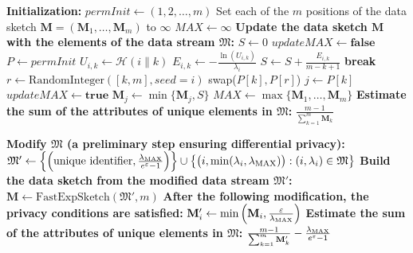 \begin{algorithm}[htbp]
\caption{FastExpSketch($\mathfrak{M}, m$)}
\label{alg:expsketch}
\begin{algorithmic}[1]
\State \textbf{Initialization:}
\State $\mathit{permInit} \gets (1, 2, \ldots, m)$
\State Set each of the $m$ positions of the data sketch $\mathbf{M} = (\mathbf{M}_1, \ldots, \mathbf{M}_m)$ to $\infty$
\State $\mathit{MAX} \gets \infty$
\State
\State \textbf{Update the data sketch $\mathbf{M}$ with the elements of the data stream $\mathfrak{M}$:}
    \State $S \gets 0$
    \State $\mathit{updateMAX} \gets \mathbf{false}$
    \State $P \gets \mathit{permInit}$
        \State $U_{i,k} \gets \mathcal{H}(i \mathbin{\|} k)$ \Comment{hash $\mathcal{H}(x) \in [0, 1)$}
        \State $E_{i,k} \gets -\frac{\ln(U_{i,k})}{\lambda_i}$
        \State $S \gets S + \frac{E_{i,k}}{m - k + 1}$
            \State \textbf{break}
        \EndIf
        \State $r \gets \mathrm{RandomInteger}([k, m], \mathit{seed} = i)$
        \State swap($P[k], P[r]$)
        \State $j \gets P[k]$
            \State $\mathit{updateMAX} \gets \mathbf{true}$
        \EndIf
        \State $\mathbf{M}_j \gets \min \{\mathbf{M}_j, S\}$
    \EndFor
        \State $\mathit{MAX} \gets \max\{\mathbf{M}_1, \ldots, \mathbf{M}_m\}$
    \EndIf
\EndFor
\State
\State \textbf{Estimate the sum of the attributes of unique elements in $\mathfrak{M}$:}
\State \Return $\frac{m-1}{\sum_{k=1}^{m} \mathbf{M}_k}$
\end{algorithmic}
\end{algorithm}

\begin{algorithm}[htbp]
\caption{DP-FastExpSketch($\mathfrak{M}, m, \lmax, \varepsilon$)}
\label{alg:df_expsketch2}
\begin{algorithmic}[1]
\State \textbf{Modify $\mathfrak{M}$ (a preliminary step ensuring differential privacy):}
\State $\mathfrak{M}' \gets \left\{ \left(\text{unique identifier}, \frac{\lambda_{\mathrm{MAX}}}{e^\varepsilon - 1}\right) \right\} \cup \left\{ \bigl(i, \min(\lambda_i, \lambda_{\mathrm{MAX}})\bigr) : (i,\lambda_i) \in \mathfrak{M} \right\}$
\State
\State \textbf{Build the data sketch from the modified data stream $\mathfrak{M}'$:}
\State $\mathbf{M} \gets \mathrm{FastExpSketch}(\mathfrak{M}', m)$
\State
\State \textbf{After the following modification, the privacy conditions are satisfied:}
    \State $\mathbf{M}'_{i} \gets \min\left(\mathbf{M}_{i}, \frac{\varepsilon}{\lambda_{\mathrm{MAX}}}\right)$
\EndFor
\State
\State \textbf{Estimate the sum of the attributes of unique elements in $\mathfrak{M}$:}
\State \Return $\frac{m-1}{\sum_{k=1}^{m} \mathbf{M}'_k} - \frac{\lambda_{\mathrm{MAX}}}{e^\varepsilon - 1}$
\end{algorithmic}
\end{algorithm}
